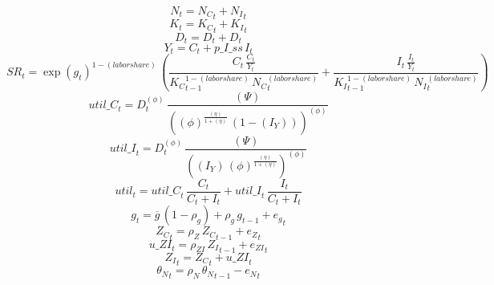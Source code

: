 \begin{dmath}
{{N}}_{t}={{N_C}}_{t}+{{N_I}}_{t}
\end{dmath}
\begin{dmath}
{{K}}_{t}={{K_C}}_{t}+{{K_I}}_{t}
\end{dmath}
\begin{dmath}
{{D}}_{t}={{D}}_{t}+{{D}}_{t}
\end{dmath}
\begin{dmath}
{{Y}}_{t}={{C}}_{t}+{p\_I\_ss}\, {{I}}_{t}
\end{dmath}
\begin{dmath}
{{SR}}_{t}=\exp\left({{g}}_{t}\right)^{1-{(labor share)}}\, \left(\frac{{{C}}_{t}\, \frac{{{C}}_{t}}{{{Y}}_{t}}}{{{K_C}}_{t-1}^{1-{(labor share)}}\, {{N_C}}_{t}^{{(labor share)}}}+\frac{{{I}}_{t}\, \frac{{{I}}_{t}}{{{Y}}_{t}}}{{{K_I}}_{t-1}^{1-{(labor share)}}\, {{N_I}}_{t}^{{(labor share)}}}\right)
\end{dmath}
\begin{dmath}
{util\_C}_{t}={{D}}_{t}^{{(\phi)}}\, \frac{{(\Psi)}}{\left({(\phi)}^{\frac{{(\eta)}}{1+{(\eta)}}}\, \left(1-{(I_Y)}\right)\right)^{{(\phi)}}}
\end{dmath}
\begin{dmath}
{util\_I}_{t}={{D}}_{t}^{{(\phi)}}\, \frac{{(\Psi)}}{\left({(I_Y)}\, {(\phi)}^{\frac{{(\eta)}}{1+{(\eta)}}}\right)^{{(\phi)}}}
\end{dmath}
\begin{dmath}
{util}_{t}={util\_C}_{t}\, \frac{{{C}}_{t}}{{{C}}_{t}+{{I}}_{t}}+{util\_I}_{t}\, \frac{{{I}}_{t}}{{{C}}_{t}+{{I}}_{t}}
\end{dmath}
\begin{dmath}
{{g}}_{t}={{\overline{g}}}\, \left(1-{{\rho_g}}\right)+{{\rho_g}}\, {{g}}_{t-1}+{{e_g}}_{t}
\end{dmath}
\begin{dmath}
{{Z_C}}_{t}={{\rho_Z}}\, {{Z_C}}_{t-1}+{{e_Z}}_{t}
\end{dmath}
\begin{dmath}
{u\_ZI}_{t}={{\rho_{ZI}}}\, {{Z_I}}_{t-1}+{{e_{ZI}}}_{t}
\end{dmath}
\begin{dmath}
{{Z_I}}_{t}={{Z_C}}_{t}+{u\_ZI}_{t}
\end{dmath}
\begin{dmath}
{{\theta_N}}_{t}={{\rho_N}}\, {{\theta_N}}_{t-1}-{{e_N}}_{t}
\end{dmath}
